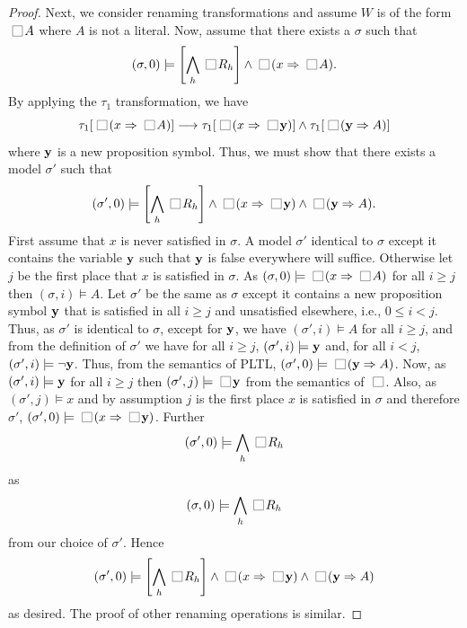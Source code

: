 \documentclass[nohyperref]{acmtrans2f}
\newcommand{\always}{\raisebox{-.2ex}{
                           \mbox{\unitlength=0.9ex
                           \begin{picture}(2,2)
                           \linethickness{0.06ex}
                           \put(0,0){\line(1,0){2}}
                           \put(0,2){\line(1,0){2}}
                           \put(0,0){\line(0,1){2}}
                           \put(2,0){\line(0,1){2}}
                           \end{picture}}}
                          \,}
\let\imp=\Rightarrow
\begin{document}
\begin{proof}
Next, we consider renaming transformations and assume $W$ is of the
form $\always A$ where $A$ is not a literal. Now, assume that there
exists a $\sigma$ such that
$$
(\sigma, 0) \models \left[\bigwedge_h \always R_h\right] \land \always
(x \imp \always A). 
$$
By applying the $\tau_1$ transformation, we have
$$
\tau_1[\always(x \imp \always A)] \longrightarrow \tau_1[\always(x \imp
\always {\bf y})] \land \tau_1[\always({\bf y} \imp A)]
$$
where ${\bf y}$ is a new proposition symbol.
Thus, we must show that there exists a model $\sigma'$ such that 
$$
(\sigma', 0) \models \left[\bigwedge_h \always R_h\right] \land
\always(x \imp \always {\bf y}) \land \always({\bf y} \imp A).
$$
First assume that $x$ is never satisfied in $\sigma$. 
A model $\sigma'$ identical to $\sigma$ except it contains the variable ${\bf y}$
such that ${\bf y}$ is false everywhere will suffice.
Otherwise let $j$ be the first place that $x$ is satisfied in $\sigma$. As $
(\sigma, 0) \models \always (x \imp \always A) $ for all $i \geq j$
then $(\sigma,i) \models A$. Let $\sigma'$ be the same as $\sigma$
except it contains a new proposition symbol ${\bf y}$ that is satisfied in all $i
\geq j$ and unsatisfied elsewhere, i.e., $0 \leq i < j$. Thus, as
$\sigma'$ is identical to 
$\sigma$, except for ${\bf y}$, we have $(\sigma',i) \models A$ for all $i
\geq j$, and from the definition of $\sigma'$ we have for all $i \geq
j$, $(\sigma',i) \models {\bf y}$ and, for all $i < j$, $(\sigma',i) \models
\neg {\bf y}$. Thus, from the semantics of PLTL, $(\sigma',0) \models
\always({\bf y} \imp A)$. Now, as $(\sigma',i) \models {\bf y}$ for all $i \geq j$
then $(\sigma',j) \models \always {\bf y}$ from the semantics of $\always$.
Also, as  $(\sigma',j) \models x$ and by assumption $j$ is the first place
$x$ is satisfied in $\sigma$ and therefore $\sigma'$,
$(\sigma', 0) \models \always (x \imp \always {\bf y})$. Further 
%
$$(\sigma', 0) \models \bigwedge_h \always R_h$$
%
as
%
$$(\sigma, 0) \models \bigwedge_h \always R_h$$
%
 from our choice of $\sigma'$. Hence
$$
(\sigma', 0) \models \left[\bigwedge_h \always R_h\right] \land
\always(x \imp \always {\bf y}) \land \always({\bf y} \imp A)
$$
as desired. The proof of other renaming operations is similar.


\end{proof}
\end{document}
